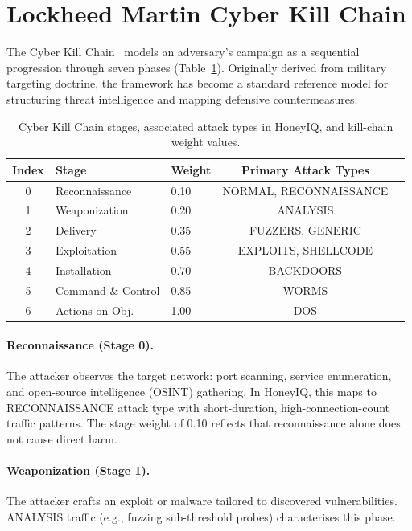 \section{Lockheed Martin Cyber Kill Chain}
\label{sec:bg_killchain}

The Cyber Kill Chain~\citep{hutchins2011intelligence} models an adversary's
campaign as a sequential progression through seven phases
(Table~\ref{tab:killchain}).
Originally derived from military targeting doctrine, the framework has become
a standard reference model for structuring threat intelligence and mapping
defensive countermeasures.

\begin{table}[ht]
  \centering
  \caption{Cyber Kill Chain stages, associated attack types in HoneyIQ,
           and kill-chain weight values.}
  \label{tab:killchain}
  \begin{tabular}{cllcl}
    \toprule
    Index & Stage & Weight & Primary Attack Types \\
    \midrule
    0 & Reconnaissance    & 0.10 & NORMAL, RECONNAISSANCE \\
    1 & Weaponization     & 0.20 & ANALYSIS \\
    2 & Delivery          & 0.35 & FUZZERS, GENERIC \\
    3 & Exploitation      & 0.55 & EXPLOITS, SHELLCODE \\
    4 & Installation      & 0.70 & BACKDOORS \\
    5 & Command \& Control & 0.85 & WORMS \\
    6 & Actions on Obj.   & 1.00 & DOS \\
    \bottomrule
  \end{tabular}
\end{table}

\paragraph{Reconnaissance (Stage 0).}
The attacker observes the target network: port scanning, service enumeration,
and open-source intelligence (OSINT) gathering.
In HoneyIQ, this maps to RECONNAISSANCE attack type with short-duration,
high-connection-count traffic patterns.
The stage weight of 0.10 reflects that reconnaissance alone does not cause
direct harm.

\paragraph{Weaponization (Stage 1).}
The attacker crafts an exploit or malware tailored to discovered
vulnerabilities.
ANALYSIS traffic (e.g., fuzzing sub-threshold probes) characterises this
phase.

